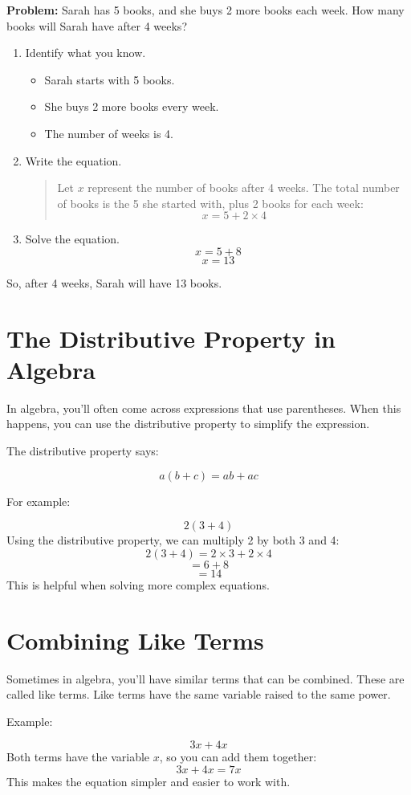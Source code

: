 \textbf{Problem:} Sarah has 5 books, and she buys 2 more books each week. How many books will Sarah have after 4 weeks?

\begin{enumerate}
    \item Identify what you know.
    \begin{itemize}
        \item Sarah starts with 5 books.
        \item She buys 2 more books every week.
        \item The number of weeks is 4.
    \end{itemize}
    \item Write the equation.
    \begin{quote}
    Let $x$ represent the number of books after 4 weeks.
    The total number of books is the 5 she started with, plus 2 books for each week:
    \[ x = 5 + 2 \times 4 \]
    \end{quote}
    \item Solve the equation.
    \[ x = 5 + 8 \]
    \[ x = 13 \]
\end{enumerate}

So, after 4 weeks, Sarah will have 13 books.

\section{The Distributive Property in Algebra}
In algebra, you’ll often come across expressions that use parentheses. When this happens, you can use the distributive property to simplify the expression.

The distributive property says:

\[ a(b + c) = ab + ac \]

For example:

\[ 2(3 + 4) \]
Using the distributive property, we can multiply 2 by both 3 and 4:
\[ 2(3 + 4) = 2 \times 3 + 2 \times 4 \]
\[ = 6 + 8 \]
\[ = 14 \]
This is helpful when solving more complex equations.

\section{Combining Like Terms}
Sometimes in algebra, you'll have similar terms that can be combined. These are called like terms. Like terms have the same variable raised to the same power.

Example:

\[ 3x + 4x \]
Both terms have the variable $x$, so you can add them together:
\[ 3x + 4x = 7x \]
This makes the equation simpler and easier to work with.

